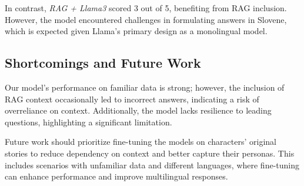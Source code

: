 \documentclass[fleqn,moreauthors,10pt]{ds_report}
\begin{document}
In contrast, \textit{RAG + Llama3} scored 3 out of 5, benefiting from RAG inclusion. However, the model encountered challenges in formulating answers in Slovene, which is expected given Llama's primary design as a monolingual model.

\subsection*{Shortcomings and Future Work}

Our model's performance on familiar data is strong; however, the inclusion of RAG context occasionally led to incorrect answers, indicating a risk of overreliance on context. Additionally, the model lacks resilience to leading questions, highlighting a significant limitation.

Future work should prioritize fine-tuning the models on characters' original stories to reduce dependency on context and better capture their personas. This includes scenarios with unfamiliar data and different languages, where fine-tuning can enhance performance and improve multilingual responses.

\clearpage
\end{document}
